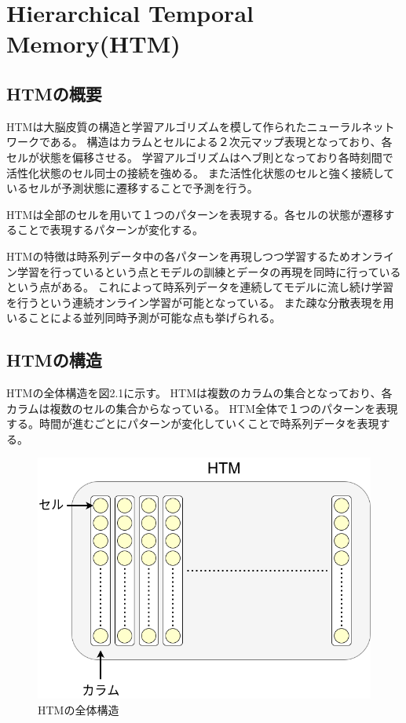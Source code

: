\chapter{Hierarchical Temporal Memory(HTM)}
\section{HTMの概要}
HTMは大脳皮質の構造と学習アルゴリズムを模して作られたニューラルネットワークである。
構造はカラムとセルによる２次元マップ表現となっており、各セルが状態を偏移させる。
学習アルゴリズムはヘブ則となっており各時刻間で活性化状態のセル同士の接続を強める。
また活性化状態のセルと強く接続しているセルが予測状態に遷移することで予測を行う。

HTMは全部のセルを用いて１つのパターンを表現する。各セルの状態が遷移することで表現するパターンが変化する。

HTMの特徴は時系列データ中の各パターンを再現しつつ学習するためオンライン学習を行っているという点とモデルの訓練とデータの再現を同時に行っているという点がある。
これによって時系列データを連続してモデルに流し続け学習を行うという連続オンライン学習が可能となっている。
また疎な分散表現を用いることによる並列同時予測が可能な点も挙げられる。

\section{HTMの構造}
HTMの全体構造を図2.1に示す。
HTMは複数のカラムの集合となっており、各カラムは複数のセルの集合からなっている。
HTM全体で１つのパターンを表現する。時間が進むごとにパターンが変化していくことで時系列データを表現する。

\begin{figure}[ht]
  \begin{center}
    \includegraphics[scale=0.5]{./fig/drawing_1}
    \caption{HTMの全体構造}
    \label{fig:HTM}
  \end{center}
\end{figure}

